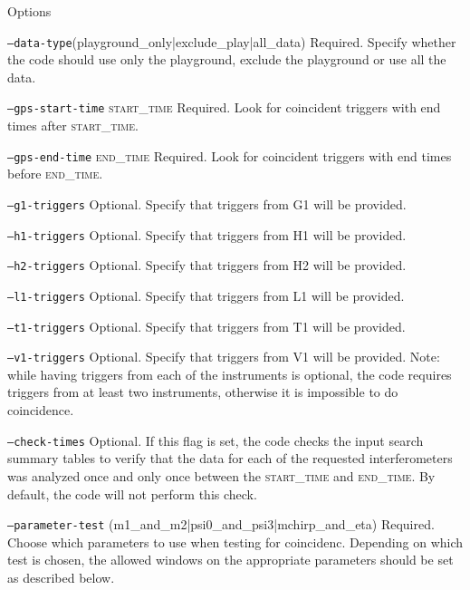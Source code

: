 \begin{entry}
\item[Options]\leavevmode
\begin{entry}

\item[\texttt{--data-type}(playground\_only|exclude\_play|all\_data)]
Required.  Specify whether the code should use only the playground, exclude
the playground or use all the data. 

\item[\texttt{--gps-start-time} \textsc{start\_time}] Required.  Look
for coincident triggers with end times after \textsc{start\_time}.

\item[\texttt{--gps-end-time} \textsc{end\_time}] Required.  Look for
coincident triggers with end times before \textsc{end\_time}.


\item[\texttt{--g1-triggers}] Optional.  Specify that triggers from G1 will be
provided.

\item[\texttt{--h1-triggers}] Optional.  Specify that triggers from H1 will be
provided.
\item[\texttt{--h2-triggers}] Optional.  Specify that triggers from H2 will be
provided.

\item[\texttt{--l1-triggers}] Optional.  Specify that triggers from L1 will be
provided.
\item[\texttt{--t1-triggers}] Optional.  Specify that triggers from T1 will be
provided.
\item[\texttt{--v1-triggers}] Optional.  Specify that triggers from V1 will be
provided.  Note: while having triggers from each of the instruments is
optional, the code requires triggers from at least two instruments, otherwise
it is impossible to do coincidence.

\item[\texttt{--check-times}] Optional.  If this flag is set, the code checks
the input search summary tables to verify that the data for each of the
requested interferometers was analyzed once and only once between the
\textsc{start\_time} and \textsc{end\_time}.  By default, the code will not
perform this check.

\item[\texttt{--parameter-test}
(m1\_and\_m2|psi0\_and\_psi3|mchirp\_and\_eta)]
Required. Choose which parameters to use when testing for coincidenc.
Depending on which test is chosen, the allowed windows on the appropriate
parameters should be set as described below.


\end{entry}
\end{entry}
